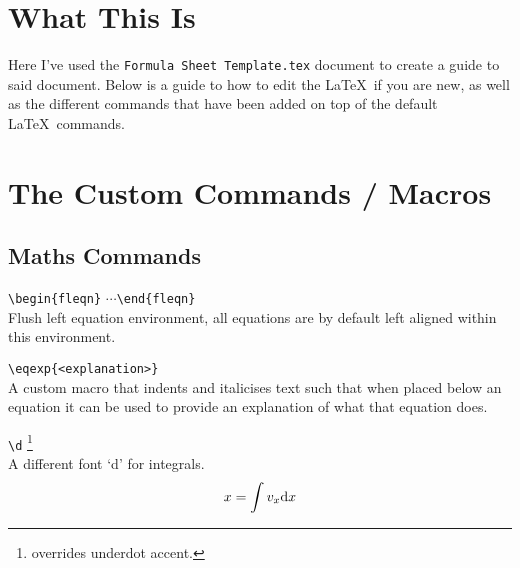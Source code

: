 \documentclass[a4paper, 12pt, english]{article}
\begin{document}

    \fullPageTitle

    \thispagestyle{noheader}
    \tableofcontents



    \newpage

    \section{What This Is}
        \label{sec: what this is}
        
        Here I've used the \verb+Formula Sheet Template.tex+ document to create a guide to said document. Below is a guide to how to edit the \LaTeX~if you are new, as well as the different commands that have been added on top of the default \LaTeX~commands.
    

    \section{The Custom Commands / Macros}
        \label{sec: custom commands}

        \subsection{Maths Commands}
            \label{subsec: maths commands}

            \verb+\begin{fleqn}+ $\cdots$\verb+\end{fleqn}+\\
            Flush left equation environment, all equations are by default left aligned within this environment.

            \verb+\eqexp{<explanation>}+\\
            A custom macro that indents and italicises text such that when placed below an equation it can be used to provide an explanation of what that equation does.

            \verb+\d+ \footnote{overrides underdot accent.}\\
            A different font `d' for integrals.
            \begin{equation*}
                x = \int v_x \mathrm{d} x
            \end{equation*}
\end{document}
